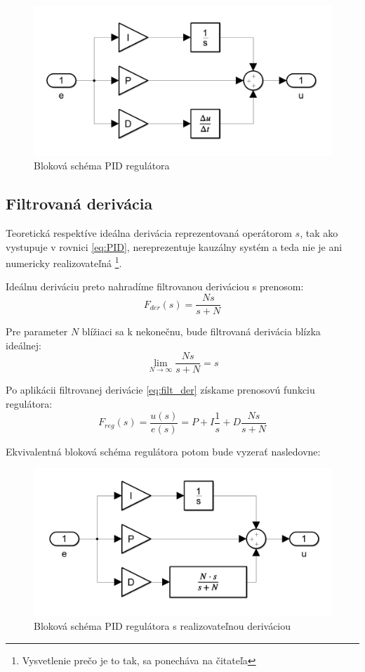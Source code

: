 \documentclass[a4paper,10pt]{article}
\begin{document}
\begin{figure}[ht]
\centering
\includegraphics[scale=0.4]{PID_schema}
\caption{Bloková schéma PID regulátora}
\end{figure}

\pagebreak

\subsection{Filtrovaná derivácia}
Teoretická respektíve ideálna derivácia reprezentovaná operátorom $s$, tak ako vystupuje v rovnici \eqref{eq:PID}, nereprezentuje kauzálny systém a teda nie je ani numericky realizovateľná \footnote{Vysvetlenie prečo je to tak, sa ponecháva na čitateľa}.

Ideálnu deriváciu preto nahradíme filtrovanou deriváciou s prenosom:
\begin{equation}
\label{eq:filt_der}
	F_{der}(s)=\frac{Ns}{s+N}
\end{equation}

Pre parameter $N$ blížiaci sa k nekonečnu, bude filtrovaná derivácia blízka ideálnej:
\begin{equation}
	\lim_{N\to\infty}\frac{Ns}{s+N}=s
\end{equation} 

Po aplikácii filtrovanej derivácie \eqref{eq:filt_der} získame prenosovú funkciu regulátora:
\begin{equation}
 \label{eq:PID_filt}
 F_{reg}(s)=\frac{u(s)}{e(s)}=P+ I\frac{1}{s}+D \frac{Ns}{s+N}
\end{equation}


Ekvivalentná bloková schéma regulátora potom bude vyzerať nasledovne:
\begin{figure}[ht]
\centering
\includegraphics[scale=0.4]{PID_schema_filt}
\caption{Bloková schéma PID regulátora s realizovateľnou deriváciou}
\end{figure}
\end{document}
